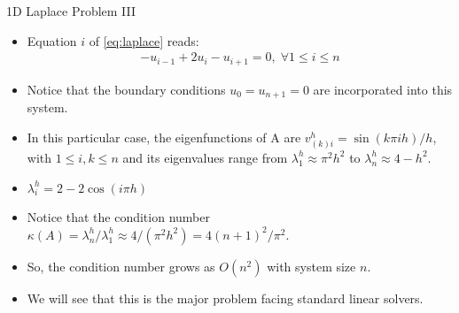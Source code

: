 \documentclass{beamer}
\begin{document}
\begin{frame}{1D Laplace Problem III}
 \begin{itemize}
  \item Equation $i$ of \eqref{eq:laplace} reads:
  \begin{align}
   -u_{i-1}+2u_i-u_{i+1} = 0, \; \forall 1 \leq i \leq n
  \end{align}
  \item Notice that the boundary conditions $u_0 = u_{n+1} = 0$ are incorporated
        into this system.
  \item In this particular case, the eigenfunctions of A are $v^h_{(k)i} = \sin(k \pi ih)/h$,
        with $1 \leq i,k \leq n$ and its eigenvalues range from $\lambda_1^h \approx \pi^2 h^2$ to
        $\lambda_n^h \approx 4-h^2$.
  \item $\lambda_i^h = 2-2\cos( i\pi h )$
  \item Notice that the condition number
        $\kappa(A) = \lambda_n^h / \lambda_1^h \approx 4/(\pi^2h^2) = 4(n+1)^2/\pi^2$.
  \item So, the condition number grows as $O(n^2)$ with system size $n$.
  \item We will see that this is the major problem facing standard linear solvers.
 \end{itemize}
\end{frame}
\end{document}
